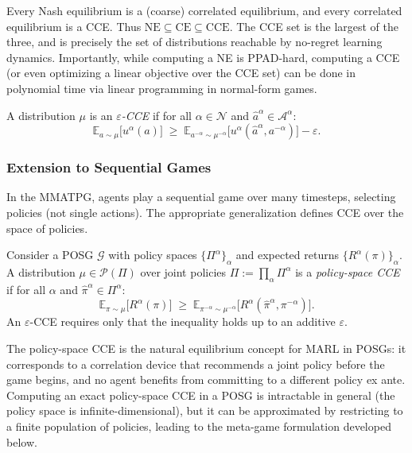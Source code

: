 \begin{remark}[CCE vs.\ NE vs.\ CE]
Every Nash equilibrium is a (coarse) correlated equilibrium, and every correlated equilibrium is a CCE. Thus $\mathrm{NE}\subseteq\mathrm{CE}\subseteq\mathrm{CCE}$. The CCE set is the largest of the three, and is precisely the set of distributions reachable by no-regret learning dynamics. Importantly, while computing a NE is PPAD-hard, computing a CCE (or even optimizing a linear objective over the CCE set) can be done in polynomial time via linear programming in normal-form games.
\end{remark}

\begin{definition}
A distribution $\mu$ is an \emph{$\varepsilon$-CCE} if for all $\alpha\in\mathcal{N}$ and $\hat a^\alpha\in\mathcal{A}^\alpha$:
\[
\mathbb{E}_{a\sim\mu}\big[u^\alpha(a)\big] \;\ge\; \mathbb{E}_{a^{-\alpha}\sim\mu^{-\alpha}}\big[u^\alpha(\hat a^\alpha, a^{-\alpha})\big] - \varepsilon.
\]
\end{definition}


\subsubsection{Extension to Sequential Games}

In the MMATPG, agents play a sequential game over many timesteps, selecting policies (not single actions). The appropriate generalization defines CCE over the space of policies.

\begin{definition}\label{def:policy-cce}
Consider a POSG $\mathcal{G}$ with policy spaces $\{\Pi^\alpha\}_\alpha$ and expected returns $\{R^\alpha(\pi)\}_\alpha$. A distribution $\mu\in\mathcal{P}(\Pi)$ over joint policies $\Pi := \prod_\alpha \Pi^\alpha$ is a \emph{policy-space CCE} if for all $\alpha$ and $\hat\pi^\alpha\in\Pi^\alpha$:
\[
\mathbb{E}_{\pi\sim\mu}\big[R^\alpha(\pi)\big] \;\ge\; \mathbb{E}_{\pi^{-\alpha}\sim\mu^{-\alpha}}\big[R^\alpha(\hat\pi^\alpha,\pi^{-\alpha})\big].
\]
An $\varepsilon$-CCE requires only that the inequality holds up to an additive $\varepsilon$.
\end{definition}

The policy-space CCE is the natural equilibrium concept for MARL in POSGs: it corresponds to a correlation device that recommends a joint policy before the game begins, and no agent benefits from committing to a different policy ex ante. Computing an exact policy-space CCE in a POSG is intractable in general (the policy space is infinite-dimensional), but it can be approximated by restricting to a finite population of policies, leading to the meta-game formulation developed below.


